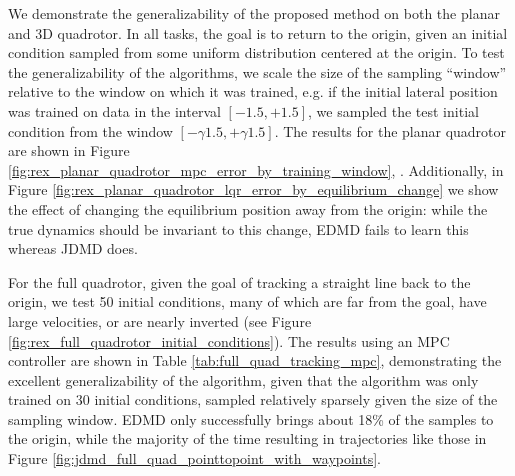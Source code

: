 \documentclass[../root.tex]{subfiles}
\begin{document}
We demonstrate the generalizability of the proposed method on both the planar and 3D 
quadrotor. In all tasks, the goal is to return to the origin, given an initial condition 
sampled from some uniform distribution centered at the origin. To test the generalizability
of the algorithms, we scale the size of the sampling ``window'' relative to the window on 
which it was trained, 
e.g. if the initial lateral position was trained on 
data in the interval $[-1.5,+1.5]$, we sampled the test initial condition from the window 
$[-\gamma 1.5, +\gamma 1.5]$. The results for the planar quadrotor 
are shown in Figure 
\ref{fig:rex_planar_quadrotor_mpc_error_by_training_window}, . 
Additionally, in Figure \ref{fig:rex_planar_quadrotor_lqr_error_by_equilibrium_change} we 
show the effect of changing the equilibrium position away from the origin: while the true 
dynamics should be invariant to this change, EDMD fails to learn this whereas JDMD does.

For the full quadrotor, given the goal of tracking a straight line back to the origin, we
test 50 initial conditions, many of which are far from the goal, have large velocities, or
are nearly inverted (see Figure \ref{fig:rex_full_quadrotor_initial_conditions}). 
The results using an MPC controller are shown in Table \ref{tab:full_quad_tracking_mpc}, 
demonstrating the excellent generalizability of the algorithm, given that the algorithm 
was only trained on 30 initial conditions, sampled relatively sparsely given the size of the 
sampling window. EDMD only successfully brings about 18\% of the samples to the origin, 
while the majority of the time resulting in trajectories like those in Figure 
\ref{fig:jdmd_full_quad_pointtopoint_with_waypoints}. 
\end{document}
